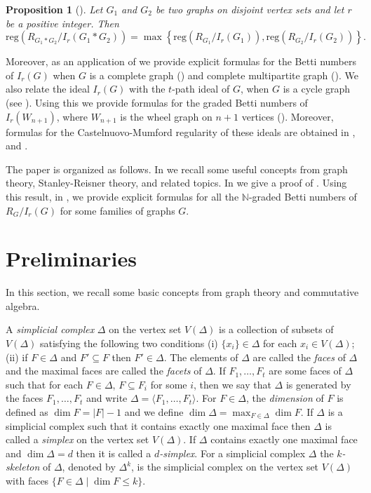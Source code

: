 \documentclass[12pt,reqno]{amsart}
\newtheorem{proposition}{Proposition}[section]
\theoremstyle{definition}
\newcommand{\N}{\mathbb N}
\begin{document}
\begin{proposition}[]
     Let $G_1$ and $G_2$ be two graphs on disjoint vertex sets and let $r$ be a positive integer. Then 
    \[
    \mathrm{reg}(R_{G_1*G_2}/I_r(G_1*G_2))=\max\left\{\mathrm{reg}(R_{G_1}/I_r(G_1)),\mathrm{reg}(R_{G_2}/I_r(G_2))\right\}.
    \]
\end{proposition}
Moreover, as an application of  we provide explicit formulas for the Betti numbers of $I_r(G)$ when $G$ is a complete graph () and complete multipartite graph (). We also relate the ideal $I_r(G)$ with the $t$-path ideal of $G$, when $G$ is a cycle graph (see ). Using this we provide formulas for the graded Betti numbers of $I_r(W_{n+1})$, where $W_{n+1}$ is the wheel graph on $n+1$ vertices (). Moreover, formulas for the Castelnuovo-Mumford regularity of these ideals are obtained in ,  and .

The paper is organized as follows. In  we recall some useful concepts from graph theory, Stanley-Reisner theory, and related topics. In  we give a proof of . Using this result, in , we provide explicit formulas for all the $\N$-graded Betti numbers of $R_G/I_r(G)$ for some families of graphs $G$.


\section{Preliminaries}\label{Section 2}

In this section, we recall some basic concepts from graph theory and commutative algebra.

A {\it simplicial complex} $\Delta$ on the vertex set $V(\Delta)$ is a collection of subsets of $V(\Delta)$ satisfying the following two conditions (i) $\{x_i\}\in \Delta$ for each $x_i\in V(\Delta)$; (ii) if $F\in \Delta$ and $F'\subseteq F$ then $F'\in \Delta$. The elements of $\Delta$ are called the {\it faces} of $\Delta$ and the maximal faces are called the {\it facets} of $\Delta$. If $F_1,\ldots, F_t$ are some faces of $\Delta$ such that for each $F\in\Delta$, $F\subseteq F_i$ for some $i$, then we say that $\Delta$ is generated by the faces $F_1,\ldots, F_t$ and write $\Delta=\langle F_1,\ldots, F_t \rangle$. For $F\in\Delta$, the {\it dimension} of $F$ is defined as $\dim F=|F|-1$ and we define $\dim\Delta=\max_{F\in \Delta}\dim F$. If $\Delta$ is a simplicial complex such that it contains exactly one maximal face then $\Delta$ is called a {\it simplex} on the vertex set $V(\Delta)$. If $\Delta$ contains exactly one maximal face and $\dim\Delta=d$ then it is called a {\it $d$-simplex}. For a simplicial complex $\Delta$ the {\it $k$-skeleton} of $\Delta$, denoted by $\Delta^k$, is the simplicial complex on the vertex set $V(\Delta)$ with faces $\{F\in\Delta\mid \dim F\le k\}$.
\end{document}
